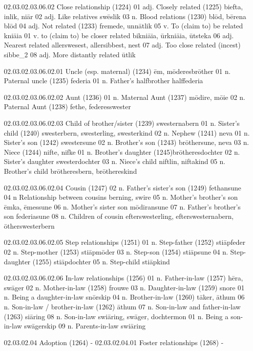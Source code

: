 02.03.02.03.06.02 Close relationship (1224)		
01 adj. Closely related (1225)		biefta, inlik, niār
		02 adj. Like relatives		swēslik	
	03 n. Blood relations (1230)		blōd, bērena blōd	
04 adj. Not related (1233)		fremede, unnātlik
05 v. To (claim to) be related		kniāia
		01 v. to (claim to) be closer related		bikniāia, ūrkniāia, ūtsteka
06 adj. Nearest related		allerswesest, allersibbest, nest
07 adj. Too close related (incest)		sibbe\_2
08 adj. More distantly related	ūtlik

02.03.02.03.06.02.01 Uncle (esp. maternal) (1234)	ēm, mōderesbrōther
		01 n. Paternal uncle (1235)		federia
			01 n. Father's halfbrother		halffederia

02.03.02.03.06.02.02 Aunt (1236)			
		01 n. Maternal Aunt (1237)		mōdire, mōie
		02 n. Paternal Aunt (1238)		fethe, federesswester

02.03.02.03.06.02.03 Child of brother/sister (1239)	swesternabern
		01 n. Sister's child (1240)		swesterbern, swesterling, swesterkind
		02 n. Nephew (1241)		neva
			01 n. Sister's son (1242)		swestersune
			02 n. Brother's son (1243)		brōthersune, neva
		03 n. Niece (1244)		nifte, nifke
			01 n. Brother's daughter (1245)brōtheresdochter
			02 n. Sister's daughter		swesterdochter
				03 n. Niece's child		niftlin, niftakind
		05 n. Brother's child		brōtheresbern, brōthereskind
	
02.03.02.03.06.02.04 Cousin (1247)			
		02 n. Father's sister's son (1249)		fethansune
		04 n Relationship between cousins		berning, swire
		05 n. Mother's brother's son		ēmka, ēmessune
		06 n. Mother's sister son		mōdiransune
		07 n. Father's brother's son		federiasune
		08 n. Children of cousin		efterswesterling, efterswesternabern,
 			ōtherswesterbern

02.03.02.03.06.02.05 Step relationships (1251)
		01 n. Step-father (1252)		stiāpfeder
		02 n. Step-mother (1253)		stiāpmōder
		03 n. Step-son (1254)		stiāpsune
		04 n. Step-daughter (1255)		stiāpdochter
		05 n. Step-child		stiāpkind

02.03.02.03.06.02.06 In-law relationships	(1256)	
01 n. Father-in-law (1257)		hēra, swāger
02 n. Mother-in-law (1258)		frouwe
03 n. Daughter-in-law (1259)		snore
	01 n. Being a daughter-in-law	snōrskip
04 n. Brother-in-law (1260)		tāker, āthum
06 n. Son-in-law / brother-in-law (1262)	āthum
07 n. Son-in-law and father-in-law (1263)	siāring
08 n. Son-in-law		swiāring, swāger, dochtermon
 	01 n. Being a son-in-law 	swāgerskip
			09 n. Parents-in-law		swiāring

02.03.02.04 Adoption (1264)	- 
02.03.02.04.01 Foster relationships (1268)		-

